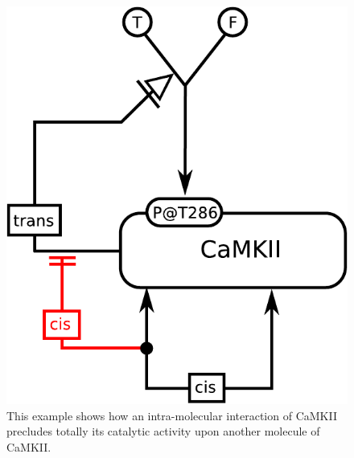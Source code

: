 \begin{figure}[H]
  \centering
  \includegraphics[scale = 0.5]{examples/ex-absoluteInhibition}
  \caption{This example shows how an intra-molecular interaction of CaMKII precludes totally its catalytic activity upon another molecule of CaMKII.}
  \label{fig:ex-absoluteInhibition}
\end{figure}

